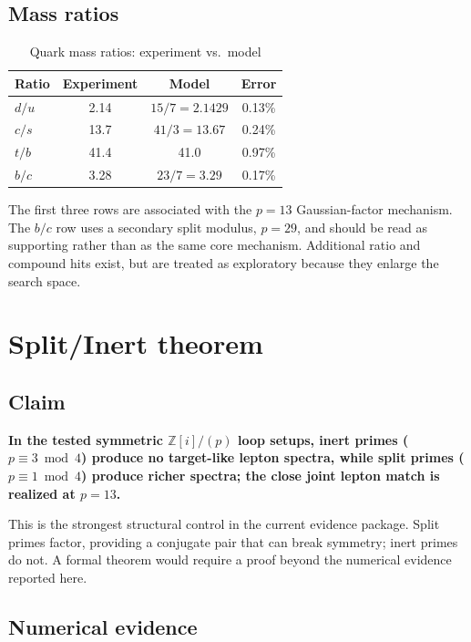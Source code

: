 \documentclass[11pt,a4paper]{article}
\begin{document}
\subsection{Mass ratios}

\begin{table}[htbp]
\centering
\caption{Quark mass ratios: experiment vs.\ model}
\begin{tabular}{lccc}
\toprule
Ratio & Experiment & Model & Error \\
\midrule
$d/u$ & 2.14 & $15/7 = 2.1429$ & 0.13\% \\
$c/s$ & 13.7 & $41/3 = 13.67$ & 0.24\% \\
$t/b$ & 41.4 & 41.0 & 0.97\% \\
$b/c$ & 3.28 & $23/7 = 3.29$ & 0.17\% \\
\bottomrule
\end{tabular}
\end{table}

The first three rows are associated with the $p=13$ Gaussian-factor mechanism. The $b/c$ row uses a secondary split modulus, $p=29$, and should be read as supporting rather than as the same core mechanism. Additional ratio and compound hits exist, but are treated as exploratory because they enlarge the search space.

\section{Split/Inert theorem}

\subsection{Claim}

\textbf{In the tested symmetric $\mathbb{Z}[i]/(p)$ loop setups, inert primes ($p \equiv 3 \bmod 4$) produce no target-like lepton spectra, while split primes ($p \equiv 1 \bmod 4$) produce richer spectra; the close joint lepton match is realized at $p=13$.}

This is the strongest structural control in the current evidence package. Split primes factor, providing a conjugate pair that can break symmetry; inert primes do not. A formal theorem would require a proof beyond the numerical evidence reported here.

\subsection{Numerical evidence}
\end{document}
